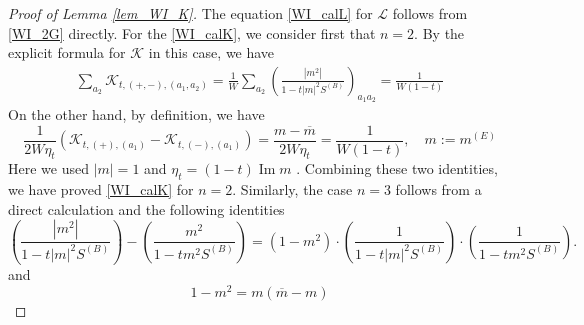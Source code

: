 \documentclass[10pt,a4paper]{amsart}
\DeclareMathOperator{\im}{{\mathrm{Im}}}
\newcommand{\cal}{\mathcal}
\renewcommand{\bar}{\overline}
\begin{document}
 \begin{proof}[Proof of Lemma \ref{lem_WI_K}]
 The equation \eqref{WI_calL} for  $\cal L$ follows from \eqref{WI_2G} directly.  For the \eqref{WI_calK}, we consider first that  $n=2$. 
By the explicit formula for $\cal K$ in this case, we have 
 \begin{align}\label{hsgw2}
 \sum_{a_2} {\cal K}_{t, (+,-), (a_1,a_2)}
 =\frac1W \sum_{a_2}
\left(\frac{|m^2|}{1-t|m|^2S^{(B)}}\right)_{a_1a_2}
=\frac{1}{W(1-t)}    
 \end{align}
 On the other hand, by definition, we have 
 $$
 \frac{1}{2W\eta_t}\left({\cal K}_{t, (+ ), ( a_1)}-{\cal K}_{t, (- ), ( a_1)}\right)=\frac{m-\bar m}{2W\eta_t}=\frac{1}{W(1-t)}, \quad m:= m^{(E)}
 $$
 Here we used $|m|=1$ and $\eta_t=(1-t)\im m$ .  Combining  these two identities, we have proved   \eqref{WI_calK} for $n=2$. 
 Similarly, the case $n=3$ follows from a direct calculation and  the following identities 
 $$
 \left(\frac{|m^2|}{1-t|m|^2S^{(B)}}\right)-\left(\frac{m^2}{1-tm^2S^{(B)}}\right)=
 \left(1-m^2\right)\cdot\left(\frac{1}{1-t|m|^2S^{(B)}}\right)\cdot \left(\frac{1}{1-tm^2S^{(B)}}\right).
 $$
 and
 $$
 1-m^2=m(\bar m-m)
 $$
 

\end{proof}
\end{document}
